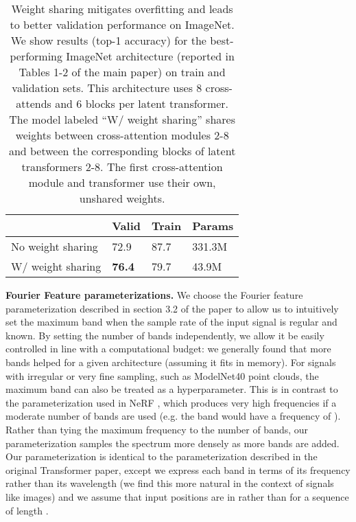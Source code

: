 \documentclass{article}
\begin{document}
\begin{table}[]
\begin{tabular}{|l|l|l|l|}
                                                                 \hline
                  & Valid         & Train       & Params   \\ \hline
No weight sharing & 72.9          & 87.7        & 331.3M         \\ \hline
W/ weight sharing & \textbf{76.4} & 79.7        & 43.9M \\ \hline
\end{tabular}
\caption{Weight sharing mitigates overfitting and leads to better validation performance on ImageNet. We show results (top-1 accuracy) for the best-performing ImageNet architecture (reported in Tables 1-2 of the main paper) on train and validation sets. This architecture uses 8 cross-attends and 6 blocks per latent transformer. The model labeled ``W/ weight sharing'' shares weights between cross-attention modules 2-8 and between the corresponding blocks of latent transformers 2-8. The first cross-attention module and transformer use their own, unshared weights.}
\label{tab:weight_sharing}
\end{table}

\noindent \textbf{Fourier Feature parameterizations.} We choose the Fourier feature parameterization described in section 3.2 of the paper to allow us to intuitively set the maximum band when the sample rate of the input signal is regular and known. By setting the number of bands independently, we allow it be easily controlled in line with a computational budget: we generally found that more bands helped for a given architecture (assuming it fits in memory). For signals with irregular or very fine sampling, such as ModelNet40 point clouds, the maximum band can also be treated as a hyperparameter. This is in contrast to the parameterization used in NeRF \cite{mildenhall2020nerf}, which produces very high frequencies if a moderate number of bands are used (e.g. the  band would have a frequency of ). Rather than tying the maximum frequency to the number of bands, our parameterization samples the spectrum more densely as more bands are added. Our parameterization is identical to the parameterization described in the original Transformer paper, except we express each band in terms of its frequency rather than its wavelength (we find this more natural in the context of signals like images) and we assume that input positions are in  rather than  for a sequence of length .
\end{document}
